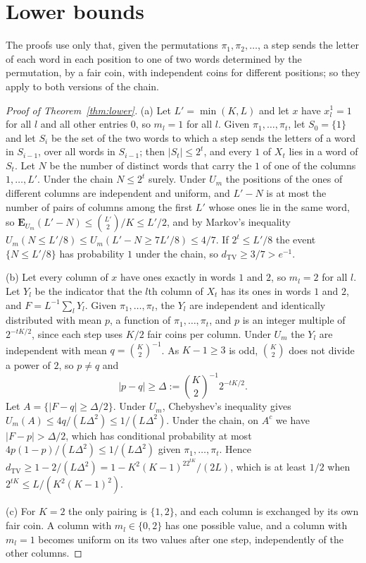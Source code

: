 \documentclass[11pt]{amsart}
\theoremstyle{remark}
\numberwithin{equation}{section}
\newcommand{\TV}{d_{\mathrm{TV}}}
\newcommand{\E}{\mathbf E}
\begin{document}
\section{Lower bounds}\label{sec:lower}

The proofs use only that, given the permutations $\pi_1,\pi_2,\dots$, a step sends the letter of each word in each position to one of two words determined by the permutation, by a fair coin, with independent coins for different positions; so they apply to both versions of the chain.

\begin{proof}[Proof of Theorem~\ref{thm:lower}]
(a) Let $L'=\min(K,L)$ and let $x$ have $x^1_l=1$ for all $l$ and all other entries $0$, so $m_l=1$ for all $l$. Given $\pi_1,\dots,\pi_t$, let $S_0=\{1\}$ and let $S_i$ be the set of the two words to which a step sends the letters of a word in $S_{i-1}$, over all words in $S_{i-1}$; then $|S_t|\le2^t$, and every $1$ of $X_t$ lies in a word of $S_t$. Let $N$ be the number of distinct words that carry the $1$ of one of the columns $1,\dots,L'$. Under the chain $N\le2^t$ surely. Under $U_m$ the positions of the ones of different columns are independent and uniform, and $L'-N$ is at most the number of pairs of columns among the first $L'$ whose ones lie in the same word, so $\E_{U_m}(L'-N)\le\binom{L'}2/K\le L'/2$, and by Markov's inequality $U_m(N\le L'/8)\le U_m(L'-N\ge 7L'/8)\le4/7$. If $2^t\le L'/8$ the event $\{N\le L'/8\}$ has probability $1$ under the chain, so $\TV\ge3/7>e^{-1}$.

(b) Let every column of $x$ have ones exactly in words $1$ and $2$, so $m_l=2$ for all $l$. Let $Y_l$ be the indicator that the $l$th column of $X_t$ has its ones in words $1$ and $2$, and $F=L^{-1}\sum_lY_l$. Given $\pi_1,\dots,\pi_t$, the $Y_l$ are independent and identically distributed with mean $p$, a function of $\pi_1,\dots,\pi_t$, and $p$ is an integer multiple of $2^{-tK/2}$, since each step uses $K/2$ fair coins per column. Under $U_m$ the $Y_l$ are independent with mean $q=\binom K2^{-1}$. As $K-1\ge3$ is odd, $\binom K2$ does not divide a power of $2$, so $p\ne q$ and
\[
|p-q|\ge\Delta:=\binom K2^{-1}2^{-tK/2}.
\]
Let $A=\{|F-q|\ge\Delta/2\}$. Under $U_m$, Chebyshev's inequality gives $U_m(A)\le4q/(L\Delta^2)\le1/(L\Delta^2)$. Under the chain, on $A^c$ we have $|F-p|>\Delta/2$, which has conditional probability at most $4p(1-p)/(L\Delta^2)\le1/(L\Delta^2)$ given $\pi_1,\dots,\pi_t$. Hence $\TV\ge1-2/(L\Delta^2)=1-K^2(K-1)^22^{tK}/(2L)$, which is at least $1/2$ when $2^{tK}\le L/(K^2(K-1)^2)$.

(c) For $K=2$ the only pairing is $\{1,2\}$, and each column is exchanged by its own fair coin. A column with $m_l\in\{0,2\}$ has one possible value, and a column with $m_l=1$ becomes uniform on its two values after one step, independently of the other columns.
\end{proof}
\end{document}
